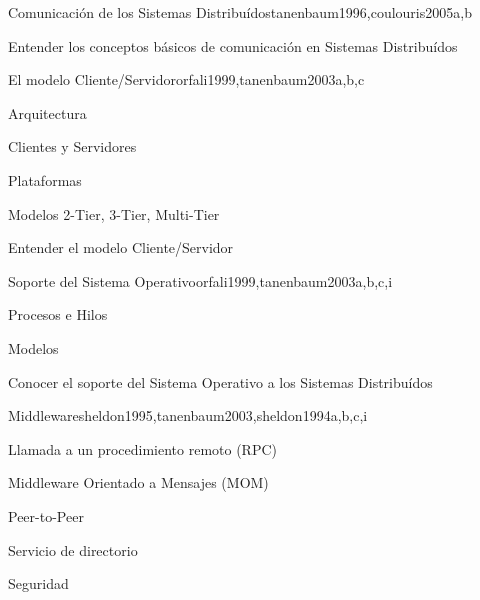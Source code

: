 \begin{syllabus}
\begin{unit}{Comunicación de los Sistemas Distribuídos}{tanenbaum1996,coulouris2005}{a,b}
   \begin{learningoutcomes}
      \item Entender los conceptos básicos de comunicación en Sistemas Distribuídos
   \end{learningoutcomes}
\end{unit}

\begin{unit}{El modelo Cliente/Servidor}{orfali1999,tanenbaum2003}{a,b,c}
   \begin{topics}
      \item Arquitectura
      \item Clientes y Servidores
      \item Plataformas
      \item Modelos 2-Tier, 3-Tier, Multi-Tier
   \end{topics}

   \begin{learningoutcomes}
      \item Entender el modelo Cliente/Servidor
   \end{learningoutcomes}
\end{unit}

\begin{unit}{Soporte del Sistema Operativo}{orfali1999,tanenbaum2003}{a,b,c,i}
   \begin{topics}
      \item Procesos e Hilos
      \item Modelos
   \end{topics}

   \begin{learningoutcomes}
      \item Conocer el soporte del Sistema Operativo a los Sistemas Distribuídos
   \end{learningoutcomes}
\end{unit}

\begin{unit}{Middleware}{sheldon1995,tanenbaum2003,sheldon1994}{a,b,c,i}
   \begin{topics}
      \item Llamada a un procedimiento remoto (RPC)
      \item Middleware Orientado a Mensajes (MOM)
      \item Peer-to-Peer
      \item Servicio de directorio
      \item Seguridad
   \end{topics}


\end{unit}
\end{syllabus}
